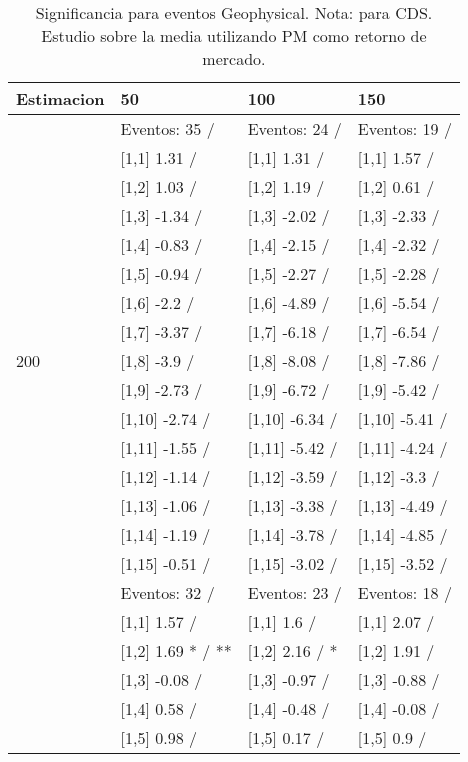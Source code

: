 \begin{table}

\caption{Significancia para eventos Geophysical. Nota: para CDS. Estudio sobre la media utilizando PM como retorno de mercado.}
\centering
\begin{tabular}[t]{llll}
\toprule
Estimacion & 50 & 100 & 150\\
\midrule
 & Eventos:  35 / & Eventos:  24 / & Eventos:  19 /\\
 & {}[1,1] 1.31  / & {}[1,1] 1.31  / & {}[1,1] 1.57  /\\
 & {}[1,2] 1.03  / & {}[1,2] 1.19  / & {}[1,2] 0.61  /\\
 & {}[1,3] -1.34  / & {}[1,3] -2.02  / & {}[1,3] -2.33  /\\
 & {}[1,4] -0.83  / & {}[1,4] -2.15  / & {}[1,4] -2.32  /\\
\addlinespace
 & {}[1,5] -0.94  / & {}[1,5] -2.27  / & {}[1,5] -2.28  /\\
 & {}[1,6] -2.2  / & {}[1,6] -4.89  / & {}[1,6] -5.54  /\\
 & {}[1,7] -3.37  / & {}[1,7] -6.18  / & {}[1,7] -6.54  /\\
200 & {}[1,8] -3.9  / & {}[1,8] -8.08  / & {}[1,8] -7.86  /\\
 & {}[1,9] -2.73  / & {}[1,9] -6.72  / & {}[1,9] -5.42  /\\
\addlinespace
 & {}[1,10] -2.74  / & {}[1,10] -6.34  / & {}[1,10] -5.41  /\\
 & {}[1,11] -1.55  / & {}[1,11] -5.42  / & {}[1,11] -4.24  /\\
 & {}[1,12] -1.14  / & {}[1,12] -3.59  / & {}[1,12] -3.3  /\\
 & {}[1,13] -1.06  / & {}[1,13] -3.38  / & {}[1,13] -4.49  /\\
 & {}[1,14] -1.19  / & {}[1,14] -3.78  / & {}[1,14] -4.85  /\\
\addlinespace
 & {}[1,15] -0.51  / & {}[1,15] -3.02  / & {}[1,15] -3.52  /\\
 & Eventos:  32 / & Eventos:  23 / & Eventos:  18 /\\
 & {}[1,1] 1.57  / & {}[1,1] 1.6  / & {}[1,1] 2.07  /\\
 & {}[1,2] 1.69 * / ** & {}[1,2] 2.16  / * & {}[1,2] 1.91  /\\
 & {}[1,3] -0.08  / & {}[1,3] -0.97  / & {}[1,3] -0.88  /\\
\addlinespace
 & {}[1,4] 0.58  / & {}[1,4] -0.48  / & {}[1,4] -0.08  /\\
 & {}[1,5] 0.98  / & {}[1,5] 0.17  / & {}[1,5] 0.9  /\\

\end{tabular}
\end{table}
